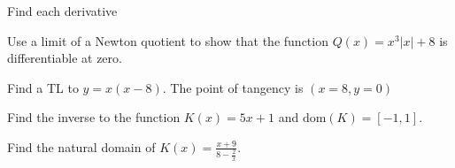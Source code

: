 \documentclass[12pt,fleqn,answers]{exam}
\newcommand{\dom}{\mbox{dom}}
\begin{document}
\begin{questions}
\begin{parts}
\end{parts}
\question Find each derivative


\question Use a limit of a Newton quotient to show that the function $Q(x) = x^3 |x| + 8$ is differentiable at zero.

\question Find a TL to $y = x(x-8)$. The point of tangency is $(x=8, y = 0)$

\question Find the inverse to the function $K(x) = 5 x + 1$ and $\dom(K) = [-1,1]$.

\question Find the natural domain of  $K(x) = \frac{x+9}{8 - \frac{2}{x}} $.


\end{questions}
\end{document}
